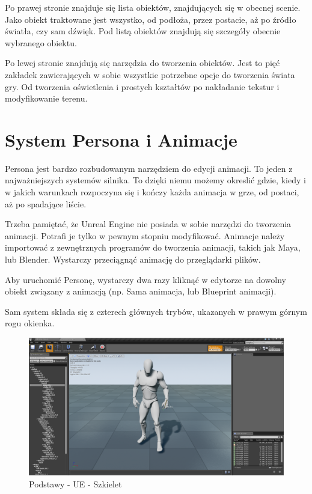\documentclass[brudnopis]{xmgr}
\begin{document}
Po prawej stronie znajduje się lista obiektów, znajdujących się w obecnej scenie. Jako obiekt traktowane jest wszystko, od podłoża, przez postacie, aż po źródło światła, czy sam dźwięk.
Pod listą obiektów znajdują się szczegóły obecnie wybranego obiektu. 

Po lewej stronie znajdują się narzędzia do tworzenia obiektów. Jest to pięć zakładek zawierających w sobie wszystkie potrzebne opcje do tworzenia świata gry. Od tworzenia oświetlenia i prostych kształtów po nakładanie tekstur i modyfikowanie terenu.
 
\section{System Persona i Animacje}
Persona jest bardzo rozbudowanym narzędziem do edycji animacji. To jeden z najważniejszych systemów silnika. To dzięki niemu możemy okreslić gdzie, kiedy i w jakich warunkach  rozpoczyna się i kończy każda animacja w grze, od postaci, aż po spadające liście.

Trzeba pamiętać, że Unreal Engine nie posiada w sobie narzędzi do tworzenia animacji. Potrafi je tylko w pewnym stopniu modyfikować. Animacje należy importować z zewnętrznych programów do tworzenia animacji, takich jak Maya, lub Blender. Wystarczy przeciągnąć animację do przeglądarki plików.

Aby uruchomić Personę, wystarczy dwa razy kliknąć w edytorze na dowolny obiekt związany z animacją (np. Sama animacja, lub Blueprint animacji).

Sam system składa się z czterech głównych trybów, ukazanych w prawym górnym rogu okienka.

\begin{figure}[!htb]
    \begin{center}
    \includegraphics[scale=0.25]{Screeny/Skeleton}
    \end{center}
    \caption{Podstawy - UE - Szkielet}
\end{figure}
\end{document}
